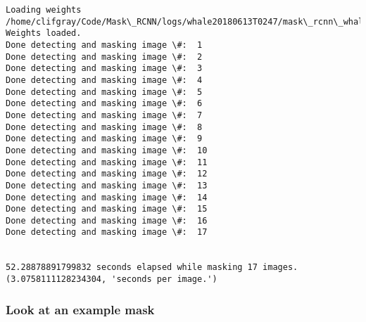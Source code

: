 \documentclass[11pt]{article}
\begin{document}
    \begin{Verbatim}[commandchars=\\\{\}]
Loading weights  /home/clifgray/Code/Mask\_RCNN/logs/whale20180613T0247/mask\_rcnn\_whale\_0150.h5
Weights loaded.
Done detecting and masking image \#:  1
Done detecting and masking image \#:  2
Done detecting and masking image \#:  3
Done detecting and masking image \#:  4
Done detecting and masking image \#:  5
Done detecting and masking image \#:  6
Done detecting and masking image \#:  7
Done detecting and masking image \#:  8
Done detecting and masking image \#:  9
Done detecting and masking image \#:  10
Done detecting and masking image \#:  11
Done detecting and masking image \#:  12
Done detecting and masking image \#:  13
Done detecting and masking image \#:  14
Done detecting and masking image \#:  15
Done detecting and masking image \#:  16
Done detecting and masking image \#:  17


52.28878891799832 seconds elapsed while masking 17 images.
(3.0758111128234304, 'seconds per image.')

    \end{Verbatim}

    \hypertarget{look-at-an-example-mask}{%
\subsubsection{Look at an example mask}\label{look-at-an-example-mask}}
\end{document}

